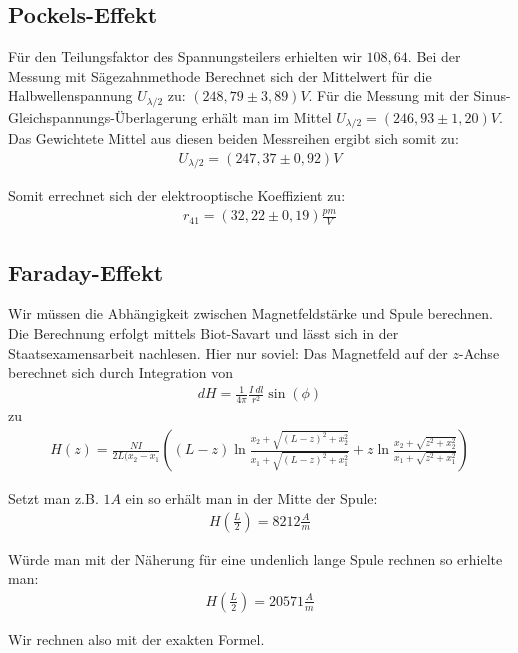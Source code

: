 \documentclass[12pt]{article}
\begin{document}
\subsection{Pockels-Effekt}
Für den Teilungsfaktor des Spannungsteilers erhielten wir $108,64$.
Bei der Messung mit Sägezahnmethode Berechnet sich der Mittelwert für die Halbwellenspannung $U_{\lambda / 2}$ zu: $(248,79 \pm 3,89)V$. Für die Messung mit der Sinus-Gleichspannungs-Überlagerung erhält man im Mittel $U_{\lambda /2} = (246,93 \pm 1,20)V$.\\

Das Gewichtete Mittel aus diesen beiden Messreihen ergibt sich somit zu: 
\begin{align*}
 U_{\lambda / 2} = (247,37 \pm 0,92)V
\end{align*}

Somit errechnet sich der elektrooptische Koeffizient zu:
\begin{align*}
 r_{41} = (32,22 \pm 0,19) \frac{pm}{V}
\end{align*}


\subsection{Faraday-Effekt}
Wir müssen die Abhängigkeit zwischen Magnetfeldstärke und Spule berechnen. Die Berechnung erfolgt mittels Biot-Savart und lässt sich in der Staatsexamensarbeit nachlesen. Hier nur soviel:
Das Magnetfeld auf der $z$-Achse berechnet sich durch Integration von
\begin{align}
 dH = \frac{1}{4\pi}\frac{I~dl}{r^2} \sin(\phi)
\end{align}
zu
\begin{align}
 H(z) = \frac{NI}{2L(x_2-x_1}\left((L-z)\ln\frac{x_2 + \sqrt{(L-z)^2 + x_2^2}}{x_1 + \sqrt{(L-z)^2 + x_1^2}} + z \ln \frac{x_2 + \sqrt{z^2 + x_2^2}}{x_1 + \sqrt{z^2 + x_1^2}}\right)
\end{align}

Setzt man z.B. $1A$ ein so erhält man in der Mitte der Spule:
\begin{align}
 H\left(\frac{L}{2}\right) = 8212 \frac{A}{m}
\end{align}

Würde man mit der Näherung für eine undenlich lange Spule rechnen so erhielte man:
\begin{align}
 H\left(\frac{L}{2}\right) = 20571 \frac{A}{m}
\end{align}

Wir rechnen also mit der exakten Formel.
\end{document}
